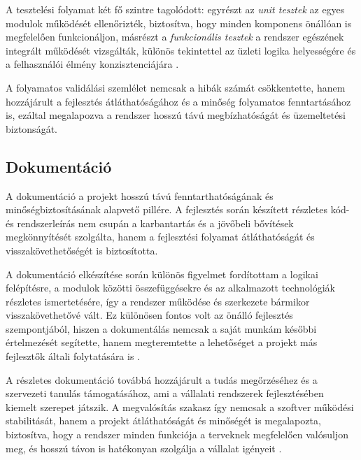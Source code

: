 A tesztelési folyamat két fő szintre tagolódott: egyrészt az \textit{unit tesztek} az egyes modulok működését ellenőrizték, 
biztosítva, hogy minden komponens önállóan is megfelelően funkcionáljon,  
másrészt a \textit{funkcionális tesztek} a rendszer egészének integrált működését vizsgálták, különös tekintettel az üzleti 
logika helyességére és a felhasználói élmény konzisztenciájára \cite{Szalay2018,Hajdu2014}.  

A folyamatos validálási szemlélet nemcsak a hibák számát csökkentette, hanem hozzájárult a fejlesztés átláthatóságához és a minőség folyamatos fenntartásához is,  
ezáltal megalapozva a rendszer hosszú távú megbízhatóságát és üzemeltetési biztonságát.

\subsection{Dokumentáció}

A dokumentáció a projekt hosszú távú fenntarthatóságának és minőségbiztosításának alapvető pillére.  
A fejlesztés során készített részletes kód- és rendszerleírás nem csupán a karbantartás és a jövőbeli bővítések megkönnyítését szolgálta,  
hanem a fejlesztési folyamat átláthatóságát és visszakövethetőségét is biztosította.  

A dokumentáció elkészítése során különös figyelmet fordítottam a logikai felépítésre, a modulok közötti összefüggésekre és az alkalmazott technológiák 
részletes ismertetésére, így a rendszer működése és szerkezete bármikor visszakövethetővé vált. 
Ez különösen fontos volt az önálló fejlesztés szempontjából, hiszen a dokumentálás nemcsak a saját munkám későbbi értelmezését segítette,  
hanem megteremtette a lehetőséget a projekt más fejlesztők általi folytatására is \cite{Kovacs2016,Kaposi2019,Szalay2018}.  

A részletes dokumentáció továbbá hozzájárult a tudás megőrzéséhez és a szervezeti tanulás támogatásához,  
ami a vállalati rendszerek fejlesztésében kiemelt szerepet játszik.  
A megvalósítás szakasz így nemcsak a szoftver működési stabilitását, hanem a projekt átláthatóságát és minőségét is megalapozta,  
biztosítva, hogy a rendszer minden funkciója a terveknek megfelelően valósuljon meg, és hosszú távon is hatékonyan szolgálja a vállalat igényeit \cite{Hajdu2014}.

